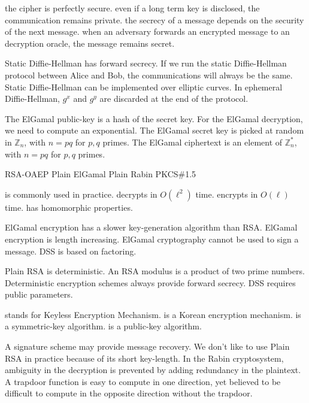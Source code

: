 {the cipher is perfectly secure.}
{even if a long term key is disclosed, the communication remains private.}
{the secrecy of a message depends on the security of the next message.}
{when an adversary forwards an encrypted message to an decryption oracle, the
message remains secret.}

{Static Diffie-Hellman has forward secrecy.}
{If we run the static Diffie-Hellman protocol between Alice and Bob, the
communications will always be the same.}
{Static Diffie-Hellman can be implemented over elliptic curves.}
{In ephemeral Diffie-Hellman, $g^x$ and $g^y$ are discarded at the end of the
protocol.}

{The ElGamal public-key is a hash of the secret key.}
{For the ElGamal decryption, we need to compute an exponential.}
{The ElGamal secret key is picked at random in $\mathbb{Z}_n$, with $n = pq$ for
$p,q$ primes. }
{The ElGamal ciphertext is an element of $\mathbb{Z}_n^*$, with $n=pq$ for $p,q$
primes.}

{RSA-OAEP}
{Plain ElGamal}
{Plain Rabin}
{PKCS\#1.5}

{is commonly used in practice.}
{decrypts in $O(\ell^2)$ time.}
{encrypts in $O(\ell)$ time.}
{has homomorphic properties.}

{ElGamal encryption has a slower key-generation algorithm than RSA.}
{ElGamal encryption is length increasing.}
{ElGamal cryptography cannot be used to sign a message.}
{DSS is based on factoring.}

 {Plain RSA is deterministic.}
 {An RSA modulus is a product of two prime numbers.}
 {Deterministic encryption schemes always provide forward secrecy.}
 {DSS requires public parameters.}
 
 {stands for Keyless Encryption Mechanism.}
 {is a Korean encryption mechanism.}
 {is a symmetric-key algorithm.}
 {is a public-key algorithm.}

{A signature scheme may provide message recovery.}
{We don't like to use Plain RSA in practice because of its short key-length.}
{In the Rabin cryptosystem, ambiguity in the decryption is prevented by adding redundancy in the plaintext.}
{A trapdoor function is easy to compute in one direction, yet believed to be
difficult to compute in the opposite direction without the trapdoor.}

